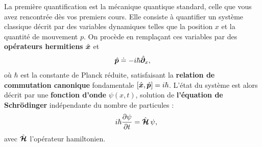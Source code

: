 La première quantification est la mécanique quantique standard, celle que vous avez rencontrée dès vos premiers cours. Elle consiste à quantifier un système classique décrit par des variables dynamiques telles que la position $x$ et la quantité de mouvement $p$. On procède en remplaçant ces variables par des {\bf opérateurs hermitiens} $\hat{\bm{x}}$ et %
\begin{eqnarray}
	\hat{\bm{p}} \doteq -i\hbar \hat{\bm{\partial}}_x,	\label{chap.1.rapel.1}
\end{eqnarray}
où $\hbar$ est la constante de Planck réduite, satisfaisant la {\bf relation de commutation canonique} fondamentale $[\hat{\bm{x}}, \hat{\bm{p}}] = i\hbar$. L’état du système est alors décrit par une {\bf fonction d’onde} $\psi(x,t)$, solution de {\bf l’équation de  Schrödinger} indépendante du nombre de particules :
\begin{eqnarray}
\quad i \hbar \frac{\partial \psi }{\partial t}  = \hat{\bm{\mathcal{H}}} \, \psi,\label{chap.1.rapel.2}
\end{eqnarray}
avec $\hat{\bm{\mathcal{H}}}$ l’opérateur hamiltonien. 

